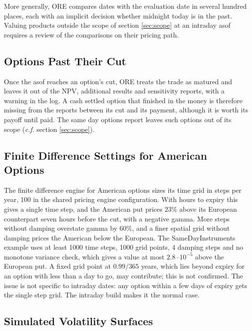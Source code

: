 \documentclass[12pt, a4paper]{article}
\begin{document}
More generally, ORE compares dates with the evaluation date in several hundred places, each with an implicit
decision whether midnight today is in the past. Valuing products outside the scope of section \ref{sec:scope} at an
intraday asof requires a review of the comparisons on their pricing path.

\subsection{Options Past Their Cut}\label{sec:lim-matured}

Once the asof reaches an option's cut, ORE treats the trade as matured and leaves it out of the NPV, additional
results and sensitivity reports, with a warning in the log. A cash settled option that finished in the money is
therefore missing from the reports between its cut and its payment, although it is worth its payoff until paid. The
same day options report leaves such options out of its scope (\textit{c.f.} section \ref{sec:scope}).

\subsection{Finite Difference Settings for American Options}\label{sec:lim-fd}

The finite difference engine for American options sizes its time grid in steps per year, 100 in the shared pricing
engine configuration. With hours to expiry this gives a single time step, and the American put prices 23\% above its
European counterpart seven hours before the cut, with a negative gamma. More steps without damping overstate gamma by
60\%, and a finer spatial grid without damping prices the American below the European. The SameDayInstruments example
uses at least 1000 time steps, 1000 grid points, 4 damping steps and no monotone variance check, which gives a value at
most $2.8\cdot10^{-5}$ above the European put. A fixed grid point at $0.99/365$ years, which lies beyond expiry for an
option with less than a day to go, may contribute; this is not confirmed. The issue is not specific to intraday dates:
any option within a few days of expiry gets the single step grid. The intraday build makes it the normal case.

\subsection{Simulated Volatility Surfaces}\label{sec:lim-simvol}
\end{document}
